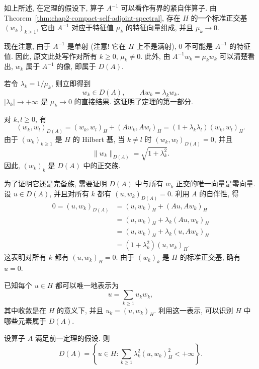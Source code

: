 \begin{Proof}
如上所述, 在定理的假设下, 算子 $A^{-1}$ 可以看作有界的紧自伴算子. 由 Theorem~\ref{thm:chap2-compact-self-adjoint-spectral}, 存在 $H$ 的一个标准正交基 $(w_k)_{k\geq1}$, 它由 $A^{-1}$ 对应于特征值 $\mu_k$ 的特征向量组成, 并且 $\mu_k\to0$.

现在注意, 由于 $A^{-1}$ 是单射 (注意! 它在 $H$ 上不是满射), $0$ 不可能是 $A^{-1}$ 的特征值. 因此, 原文此处写作对所有 $k\geq0$, $\mu_k\neq0$. 此外, 由 $A^{-1}w_k=\mu_k w_k$ 可以清楚看出, $w_k$ 属于 $A^{-1}$ 的像, 即属于 $D(A)$.

若令 $\lambda_k=1/\mu_k$, 则立即得到
\[
 w_k\in D(A),\qquad Aw_k=\lambda_k w_k.
\]
$|\lambda_k|\to+\infty$ 是 $\mu_k\to0$ 的直接结果. 这证明了定理的第一部分.

对 $k,l\geq0$, 有
\[
 (w_k,w_l)_{D(A)}=(w_k,w_l)_H+(Aw_k,Aw_l)_H
 =(1+\lambda_k\lambda_l)(w_k,w_l)_H.
\]
由于 $(w_k)_{k\geq1}$ 是 $H$ 的 Hilbert 基, 当 $k\neq l$ 时 $(w_k,w_l)_{D(A)}=0$, 并且
\[
 \|w_k\|_{D(A)}=\sqrt{1+\lambda_k^2}.
\]
因此, $(w_k)_k$ 是 $D(A)$ 中的正交族.

为了证明它还是完备族, 需要证明 $D(A)$ 中与所有 $w_k$ 正交的唯一向量是零向量. 设 $u\in D(A)$, 并且对所有 $k$ 都有 $(u,w_k)_{D(A)}=0$. 利用 $A$ 的自伴性, 得
\[
\begin{aligned}
 0=(u,w_k)_{D(A)}
 &= (u,w_k)_H+(Au,Aw_k)_H\\
 &= (u,w_k)_H+\lambda_k(Au,w_k)_H\\
 &= (u,w_k)_H+\lambda_k(u,Aw_k)_H\\
 &= (1+\lambda_k^2)(u,w_k)_H.
\end{aligned}
\]
这表明对所有 $k$ 都有 $(u,w_k)_H=0$. 由于 $(w_k)_k$ 是 $H$ 的标准正交基, 确有 $u=0$.
\end{Proof}

已知每个 $u\in H$ 都可以唯一地表示为
\[
 u=\sum_{k\geq1}u_kw_k,
\]
其中收敛是在 $H$ 的意义下, 并且 $u_k=(u,w_k)_H$. 利用这一表示, 可以识别 $H$ 中哪些元素属于 $D(A)$.

\begin{Proposition}
\label{prop:chap2-domain-spectral-characterization}
设算子 $A$ 满足前一定理的假设. 则
\[
 D(A)=\left\{u\in H:\sum_{k\geq1}\lambda_k^2(u,w_k)_H^2<+\infty\right\}.
\]
\end{Proposition}

